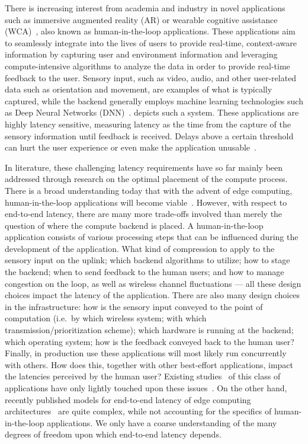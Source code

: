 There is increasing interest from academia and industry in novel applications such as immersive augmented reality (AR) or wearable cognitive assistance (WCA)~\cite{Chatzopoulos:Hyperion,Ha:TowardsWearableCogAssist}, also known as human-in-the-loop applications.
These applications aim to seamlessly integrate into the lives of users to provide real-time, context-aware information by capturing user and environment information and leveraging compute-intensive algorithms to analyze the data in order to provide real-time feedback to the user.
Sensory input, such as video, audio, and other user-related data such as orientation and movement, are examples of what is typically captured, while the backend generally employs machine learning technologies such as Deep Neural Networks (DNN)~\cite{Ha:TowardsWearableCogAssist}.
 depicts such a system.
These applications are highly latency sensitive, measuring latency as the time from the capture of the sensory information until feedback is received.
Delays above a certain threshold can hurt the user experience or even make the application unusable~\cite{Chen:AnEmpiricalStudyOfLatency}.

In literature, these challenging latency requirements have so far mainly been addressed through research on the optimal placement of the compute process.
There is a broad understanding today that with the advent of edge computing, human-in-the-loop applications will become viable~\cite{Bittmann_Edge,flinn2012cyber,Chen:AnEmpiricalStudyOfLatency,Ha:JITProvisioning}.
However, with respect to end-to-end latency, there are many more trade-offs involved than merely the question of where the compute backend is placed.
A human-in-the-loop application consists of various processing steps that can be influenced during the development of the application.
What kind of compression to apply to the sensory input on the uplink; which backend algorithms to utilize; how to stage the backend; when to send feedback to the human users; and how to manage congestion on the loop, as well as wireless channel fluctuations --- all these design choices impact the latency of the application.
There are also many design choices in the infrastructure: how is the sensory input conveyed to the point of computation (i.e.\ by which wireless system; with which transmission/prioritization scheme); which hardware is running at the backend; which operating system; how is the feedback conveyed back to the human user?
Finally, in production use these applications will most likely run concurrently with others.
How does this, together with other best-effort applications, impact the latencies perceived by the human user?
Existing studies~\cite{Ha:TowardsWearableCogAssist, Chen:EarlyImplementation, satya2009case,Chatzopoulos:Hyperion} of this class of applications have only lightly touched upon these issues~\cite{Chen:AnEmpiricalStudyOfLatency}.
On the other hand, recently published models for end-to-end latency of edge computing architectures~\cite{Zubaidy15,Schiessl17} are quite complex, while not accounting for the specifics of human-in-the-loop applications.
We only have a coarse understanding of the many degrees of freedom upon which end-to-end latency depends.

